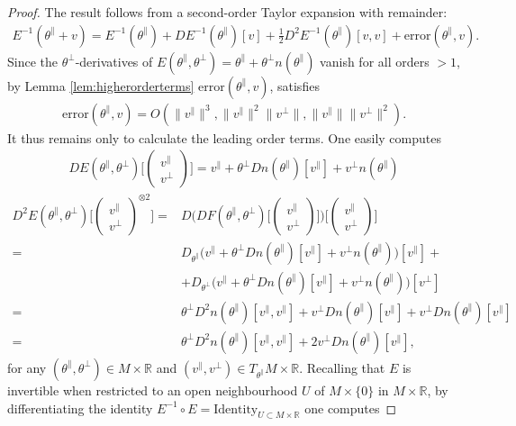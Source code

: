 \documentclass{article}
\newcommand{\RB}{\mathbb{R}}
\newcommand{\tpa}{\theta^{\parallel}}
\newcommand{\tpe}{\theta^{\perp}}
\theoremstyle{plain}
\theoremstyle{definition}
\theoremstyle{remark}
\begin{document}
\begin{proof}
    The result follows from a second-order Taylor expansion with remainder:
    \begin{align}
        E^{-1}(\tpa+v) = E^{-1}(\tpa) + DE^{-1}(\tpa)[v] + \frac{1}{2}D^2E^{-1}(\tpa)[v,v] + \text{error}(\tpa,v).
    \end{align}
    Since the $\tpe$-derivatives of $E(\tpa,\tpe) = \tpa+\tpe n(\tpa)$ vanish for all orders $>1$, by Lemma \ref{lem:higherorderterms} $\text{error}(\tpa,v)$, satisfies
    \begin{align}
        \text{error}(\tpa,v) = O(\|v^{\parallel}\|^3,\|v^{\parallel}\|^2\|v^{\perp}\|,\|v^{\parallel}\|\|v^{\perp}\|^2).
    \end{align}
    It thus remains only to calculate the leading order terms. One easily computes
    \begin{align}
        DE(\tpa,\tpe)\bigg[\begin{pmatrix} v^{\parallel} \\ v^{\perp}\end{pmatrix}\bigg] = v^{\parallel} + \tpe Dn(\tpa)[v^{\parallel}] + v^{\perp}n(\tpa)
    \end{align}
    \begin{align}
        D^2E(\tpa,\tpe)\bigg[\begin{pmatrix} v^{\parallel}\\v^{\perp}\end{pmatrix}^{\otimes 2}\bigg] =& D\bigg(DF(\tpa,\tpe)\bigg[\begin{pmatrix} v^{\parallel}\\v^{\perp}\end{pmatrix}\bigg]\bigg)\bigg[\begin{pmatrix} v^{\parallel}\\v^{\perp}\end{pmatrix}\bigg]\\=&D_{\tpa}\big(v^{\parallel}+\tpe Dn(\tpa)[v^{\parallel}] + v^{\perp}n(\tpa)\big)[v^{\parallel}] +\\&+ D_{\tpe}\big(v^{\parallel}+\tpe Dn(\tpa)[v^{\parallel}] + v^{\perp}n(\tpa)\big)[v^{\perp}]\\=&\tpe D^2n(\tpa)[v^{\parallel},v^{\parallel}] + v^{\perp}Dn(\tpa)[v^{\parallel}] + v^{\perp}Dn(\tpa)[v^{\parallel}]\\=&\tpe D^2n(\tpa)[v^{\parallel},v^{\parallel}] + 2v^{\perp}Dn(\tpa)[v^{\parallel}],\label{eq:D2E}
    \end{align}
    for any $(\tpa,\tpe)\in M\times\RB$ and $(v^{\parallel},v^{\perp})\in T_{\tpa}M\times \RB$. Recalling that $E$ is invertible when restricted to an open neighbourhood $U$ of $M\times\{0\}$ in $M\times\RB$, by differentiating the identity $E^{-1}\circ E = \text{Identity}_{U\subset M\times\RB}$ one computes

\end{proof}
\end{document}
